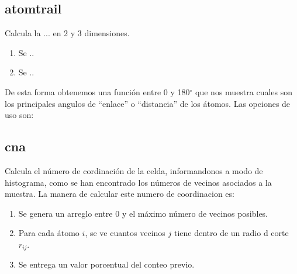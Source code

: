 \subsection{atomtrail}
Calcula la ... en 2 y 3 dimensiones.
\begin{enumerate}
 \item Se ..
 \item Se ..
\end{enumerate}

De esta forma obtenemos una funci\'on entre 0 y 180$^\circ$ que nos muestra cuales son los principales angulos de ``enlace'' o ``distancia'' de los \'atomos. Las opciones de uso son:


\subsection{cna}
Calcula el n\'umero de cordinaci\'on de la celda, informandonos a modo de histograma, como se han encontrado los n\'umeros de vecinos asociados a la muestra. La manera de calcular este numero de coordinacion es:

\begin{enumerate}
 \item Se genera un arreglo entre 0 y el m\'aximo n\'umero de vecinos posibles.
 \item Para cada \'atomo $i$, se ve cuantos vecinos $j$ tiene dentro de un radio d corte $r_{ij}$.
 \item Se entrega un valor porcentual del conteo previo.
\end{enumerate}


